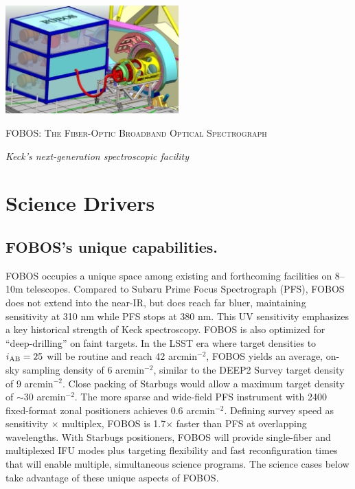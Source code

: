 \documentclass[oneside,11pt]{amsart}
\begin{document}


\vspace*{-1.5cm}

\centerline{\includegraphics[width=0.5\textwidth]{figs/FOBOS_inst_v2.pdf}}
\centerline{\textsc {\Large FOBOS: The Fiber-Optic Broadband Optical Spectrograph}}
\smallskip
\centerline{\large\it Keck's next-generation spectroscopic facility}




\section{Science Drivers}
\label{sec:goals}


\subsection{FOBOS's unique capabilities.} FOBOS occupies a unique space among existing and forthcoming
facilities on 8--10m telescopes.  Compared to Subaru Prime Focus Spectrograph (PFS), FOBOS does not extend into the near-IR, but does reach far bluer, maintaining sensitivity at 310 nm while PFS stops at 380 nm.  This UV sensitivity emphasizes a key historical strength of Keck spectroscopy.  FOBOS is also optimized for ``deep-drilling'' on faint targets. In the LSST era where target densities to $i_{\rm AB} = 25$ will be routine and reach 42 arcmin$^{-2}$, FOBOS yields an average, on-sky sampling density of 6 arcmin$^{-2}$, similar to the DEEP2 Survey target density of 9 arcmin$^{-2}$.  Close packing of Starbugs would allow a maximum target density of $\sim$30 arcmin$^{-2}$.  The more sparse and wide-field PFS instrument with 2400 fixed-format zonal positioners achieves 0.6 arcmin$^{-2}$.  Defining survey speed as sensitivity $\times$ multiplex, FOBOS is 1.7$\times$ faster than PFS at overlapping wavelengths.  With Starbugs positioners, FOBOS will provide single-fiber and multiplexed IFU modes plus targeting flexibility and fast reconfiguration times that will enable multiple, simultaneous science programs.  The
science cases below take advantage of these unique aspects of FOBOS.
\end{document}
